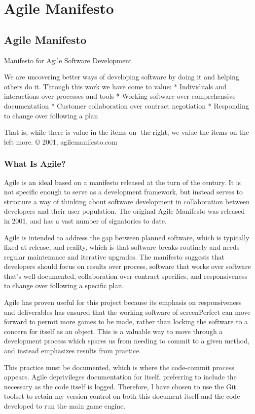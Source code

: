 
\chapter{Agile Manifesto} %

\label{AppendixA} %


\section{Agile Manifesto}

Manifesto for Agile Software Development

We are uncovering better ways of developing software by doing it and helping others do it.
Through this work we have come to value:
* Individuals and interactions over processes and tools
* Working software over comprehensive documentation
* Customer collaboration over contract negotiation
* Responding to change over following a plan

That is, while there is value in the items on  the right, we value the items on the left more.
© 2001, agilemanifesto.com

\subsection{What Is Agile?}
Agile is an ideal based on a manifesto released at the turn of the century. It is not specific enough to serve as a development framework, but instead serves to structure a way of thinking about software development in collaboration between developers and their user population. The original Agile Manifesto was released in 2001, and has a vast number of signatories to date. 

Agile is intended to address the gap between planned software, which is typically fixed at release, and reality, which is that software breaks routinely and needs regular maintenance and iterative upgrades. The manifesto suggests that developers should focus on results over process, software that works over software that’s well-documented, collaboration over contract specifics, and responsiveness to change over following a specific plan.

Agile has proven useful for this project because its emphasis on responsiveness and deliverables has ensured that the working software of screenPerfect can move forward to permit more games to be made, rather than locking the software to a concern for itself as an object. This is a valuable way to move through a development process which spares us from needing to commit to a given method, and instead emphasizes results from practice.

This practice must be documented, which is where the code-commit process appears. Agile deprivileges documentation for itself, preferring to include the necessary as the code itself is logged. Therefore, I have chosen to use the Git toolset to retain my version control on both this document itself and the code developed to run the main game engine.